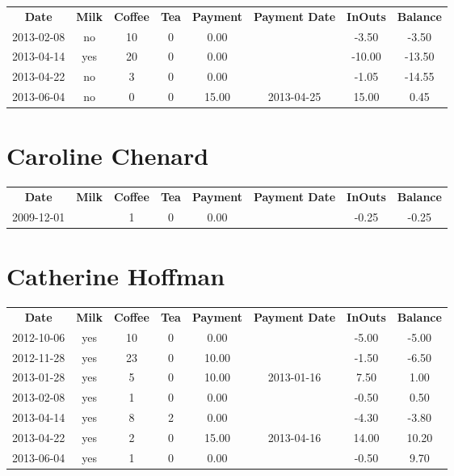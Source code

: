 \begin{center}
\begin{tabular}{cccccccc}
\textbf{Date} & \textbf{Milk} & \textbf{Coffee} & \textbf{Tea} & \textbf{Payment} & \textbf{Payment Date} & \textbf{InOuts} & \textbf{Balance} \\
2013-02-08 & no & 10 & 0 &  0.00 &  &  -3.50 &  -3.50\\ 
2013-04-14 & yes & 20 & 0 &  0.00 &  & -10.00 & -13.50\\ 
2013-04-22 & no &  3 & 0 &  0.00 &  &  -1.05 & -14.55\\ 
2013-06-04 & no &  0 & 0 & 15.00 & 2013-04-25 &  15.00 &   0.45
\end{tabular}
\end{center}

\section{Caroline Chenard}

\begin{center}
\begin{tabular}{cccccccc}
\textbf{Date} & \textbf{Milk} & \textbf{Coffee} & \textbf{Tea} & \textbf{Payment} & \textbf{Payment Date} & \textbf{InOuts} & \textbf{Balance} \\
2009-12-01 &  & 1 & 0 & 0.00 &  & -0.25 & -0.25
\end{tabular}
\end{center}

\section{Catherine Hoffman}

\begin{center}
\begin{tabular}{cccccccc}
\textbf{Date} & \textbf{Milk} & \textbf{Coffee} & \textbf{Tea} & \textbf{Payment} & \textbf{Payment Date} & \textbf{InOuts} & \textbf{Balance} \\
2012-10-06 & yes & 10 & 0 &  0.00 &  & -5.00 & -5.00\\ 
2012-11-28 & yes & 23 & 0 & 10.00 &  & -1.50 & -6.50\\ 
2013-01-28 & yes &  5 & 0 & 10.00 & 2013-01-16 &  7.50 &  1.00\\ 
2013-02-08 & yes &  1 & 0 &  0.00 &  & -0.50 &  0.50\\ 
2013-04-14 & yes &  8 & 2 &  0.00 &  & -4.30 & -3.80\\ 
2013-04-22 & yes &  2 & 0 & 15.00 & 2013-04-16 & 14.00 & 10.20\\ 
2013-06-04 & yes &  1 & 0 &  0.00 &  & -0.50 &  9.70
\end{tabular}
\end{center}

